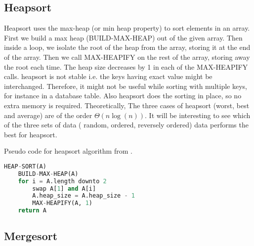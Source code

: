 \documentclass[sigconf, nonacm, natbib, screen, balance=False]{acmart}
\begin{document}
\subsection{Heapsort}\label{sec:heapsort}
Heapsort uses the max-heap (or min heap property) to sort elements in an array. First we build a max heap (BUILD-MAX-HEAP) out of the given array. Then inside a loop, we isolate the root of the heap from the array, storing it at the end of the array. Then we call MAX-HEAPIFY on the rest of the array, storing away the root each time. The heap size decreases by 1 in each of the MAX-HEAPIFY calls. heapsort is not stable i.e. the keys having exact value might be interchanged. Therefore, it might not be useful while sorting with multiple keys, for instance in a database table.\newline
Also heapsort does the sorting in place, so no extra memory is required. Theoretically, The three cases of heapsort (worst, best and average) are of the order $\Theta \left(n\log\left(n\right)\right)$. It will be interesting to see which of the three sets of data ( random, ordered, reversely ordered) data performs the best for heapsort. 

\begin{listing}
\caption{Pseudo code for heapsort algorithm from \citet[Ch.~6.4]{CLRS_2009}.}
\label{lst:heap_algo}
\begin{lstlisting}[language=Python]
HEAP-SORT(A)
    BUILD-MAX-HEAP(A)
    for i = A.length downto 2
        swap A[1] and A[i]
        A.heap_size = A.heap_size - 1
        MAX-HEAPIFY(A, 1)
    return A
\end{lstlisting}
\end{listing}

\subsection{Mergesort}\label{sec:mergesort}
\end{document}
